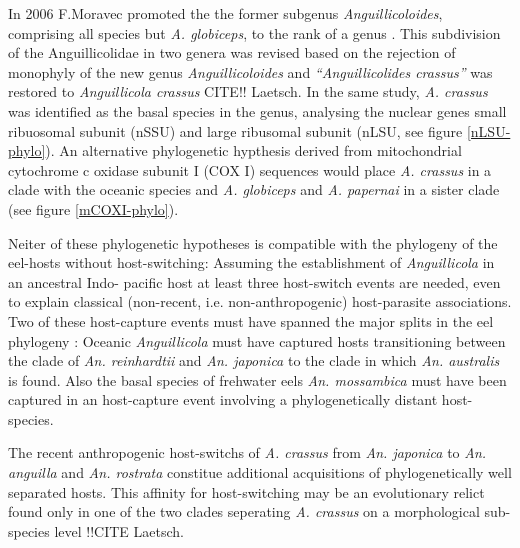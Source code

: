 In 2006 F.Moravec promoted the the former subgenus
\textit{Anguillicoloides}, comprising all species but
\textit{A. globiceps}, to the rank of a genus
\cite{moravec_anguillicoloides}. This subdivision of the
Anguillicolidae in two genera was revised based on the rejection of
monophyly of the new genus \textit{Anguillicoloides} and
\textit{``Anguillicolides crassus''} was restored to
\textit{Anguillicola crassus} CITE!! Laetsch. In the same study,
\textit{A. crassus} was identified as the basal species in the genus,
analysing the nuclear genes small ribuosomal subunit (nSSU) and large
ribusomal subunit (nLSU, see figure \ref{nLSU-phylo}). An alternative
phylogenetic hypthesis derived from mitochondrial cytochrome c oxidase
subunit I (COX I) sequences would place \textit{A. crassus} in a clade
with the oceanic species and \textit{A. globiceps} and
\textit{A. papernai} in a sister clade (see figure \ref{mCOXI-phylo}).

Neiter of these phylogenetic hypotheses is compatible with the
phylogeny of the eel-hosts without host-switching: Assuming the
establishment of \textit{Anguillicola} in an ancestral Indo- pacific
host at least three host-switch events are needed, even to explain
classical (non-recent, i.e. non-anthropogenic) host-parasite
associations. Two of these host-capture events must have spanned the
major splits in the eel phylogeny \cite{minegishi_molecular_2005}:
Oceanic \textit{Anguillicola} must have captured hosts transitioning
between the clade of \textit{An. reinhardtii} and
\textit{An. japonica} to the clade in which \textit{An. australis} is
found. Also the basal species of frehwater eels
\textit{An. mossambica} must have been captured in an host-capture
event involving a phylogenetically distant host-species.


The recent anthropogenic host-switchs of \textit{A. crassus} from
\textit{An. japonica} to \textit{An. anguilla} and
\textit{An. rostrata} constitue additional acquisitions of
phylogenetically well separated hosts. This affinity for
host-switching may be an evolutionary relict found only in one of the
two clades seperating \textit{A. crassus} on a morphological
sub-species level !!CITE Laetsch.

